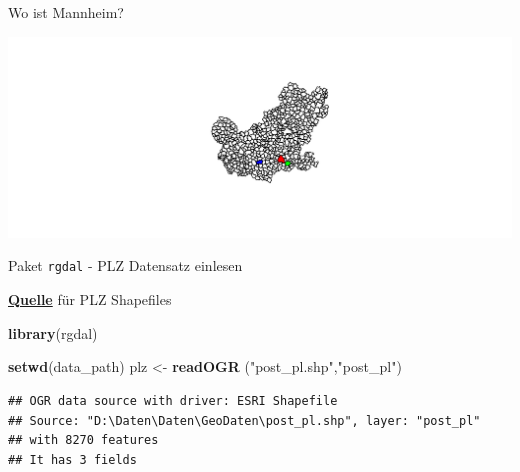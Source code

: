 \documentclass[ignorenonframetext,]{beamer}
\newenvironment{Shaded}{\begin{snugshade}}{\end{snugshade}}
\newcommand{\KeywordTok}[1]{\textcolor[rgb]{0.13,0.29,0.53}{\textbf{#1}}}
\newcommand{\DataTypeTok}[1]{\textcolor[rgb]{0.13,0.29,0.53}{#1}}
\newcommand{\StringTok}[1]{\textcolor[rgb]{0.31,0.60,0.02}{#1}}
\newcommand{\OperatorTok}[1]{\textcolor[rgb]{0.81,0.36,0.00}{\textbf{#1}}}
\newcommand{\NormalTok}[1]{#1}
\begin{document}
\begin{frame}[fragile]{Wo ist Mannheim?}

\begin{Shaded}
\end{Shaded}

\includegraphics{Shapefiles_files/figure-beamer/unnamed-chunk-10-1.pdf}

\end{frame}

\begin{frame}[fragile]{Paket \texttt{rgdal} - PLZ Datensatz einlesen}

\begin{block}{\href{http://arnulf.us/PLZ}{\textbf{Quelle}} für PLZ
Shapefiles}

\begin{Shaded}
\begin{Highlighting}[]
\KeywordTok{library}\NormalTok{(rgdal)}
\end{Highlighting}
\end{Shaded}

\begin{Shaded}
\begin{Highlighting}[]
\KeywordTok{setwd}\NormalTok{(data_path)}
\NormalTok{plz <-}\StringTok{ }\KeywordTok{readOGR}\NormalTok{ (}\StringTok{"post_pl.shp"}\NormalTok{,}\StringTok{"post_pl"}\NormalTok{)}
\end{Highlighting}
\end{Shaded}

\begin{verbatim}
## OGR data source with driver: ESRI Shapefile 
## Source: "D:\Daten\Daten\GeoDaten\post_pl.shp", layer: "post_pl"
## with 8270 features
## It has 3 fields
\end{verbatim}

\end{block}

\end{frame}
\end{document}

